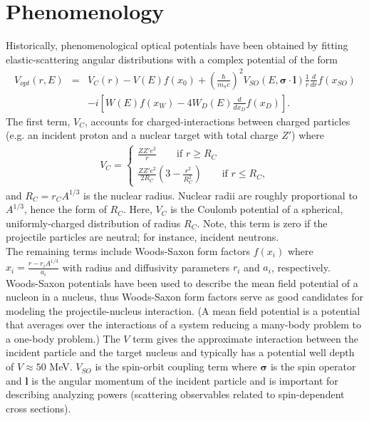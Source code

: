 \documentclass[preprintnumbers,floatfix,aps,prc,preprint,nofootinbib]{revtex4-1}
\begin{document}
\section{Phenomenology}
\label{sec:phenomenology}


Historically, phenomenological optical potentials have been obtained by fitting elastic-scattering angular distributions with a complex potential of the form \cite{Perey:1976zz, Dickhoff:2018wdd}
%
\begin{eqnarray}
	\label{eq:phenomenological_optical_potential}
	V_{opt}(r, E) &=& V_C(r) - V(E) f(x_0) + (\frac{\hbar}{m_{\pi} c})^2 V_{SO}(E, \bm{\sigma} \cdot \textbf{l}) \frac{1}{r} \frac{d}{dr} f(x_{SO}) \nonumber \\ 
& &- i [W(E) f(x_W) - 4 W_D(E) \frac{d}{dx_D} f(x_D)].
\end{eqnarray}
%
The first term, $V_C$, accounts for charged-interactions between charged particles (e.g. an incident proton and a nuclear target with total charge $Z'$) where
%
\begin{eqnarray}
	\label{eq:coulomb_potential}
	V_C =
	\begin{cases}
		\frac{Z Z' e^2}{r} \qquad \text{if $r \geq R_C$} \\
		\frac{Z Z' e^2}{2 R_C} (3 - \frac{r^2}{R_C^2}) \qquad \text{if $r \leq R_C$},
	\end{cases}
\end{eqnarray}
%
and $R_C = r_C A^{1/3}$ is the nuclear radius. Nuclear radii are roughly proportional to $A^{1/3}$, hence the form of $R_C$. Here, $V_C$ is the Coulomb potential of a spherical, uniformly-charged distribution of radius $R_C$. Note, this term is zero if the projectile particles are neutral; for instance, incident neutrons.
\\

The remaining terms include Woods-Saxon form factors $f(x_i)$ where $x_i = \frac{r-r_i A^{1/3}}{a_i}$ with radius and diffusivity parameters $r_i$ and $a_i$, respectively. Woods-Saxon potentials have been used to describe the mean field potential of a nucleon in a nucleus, thus Woods-Saxon form factors serve as good candidates for modeling the projectile-nucleus interaction. (A mean field potential is a potential that averages over the interactions of a system reducing a many-body problem to a one-body problem.) The $V$ term gives the approximate interaction between the incident particle and the target nucleus and typically has a potential well depth of $V \approx 50$ MeV. $V_{SO}$ is the spin-orbit coupling term where $\bm{\sigma}$ is the spin operator and $\bm{l}$ is the angular momentum of the incident particle and is important for describing analyzing powers (scattering observables related to spin-dependent cross sections).
\\
\end{document}
